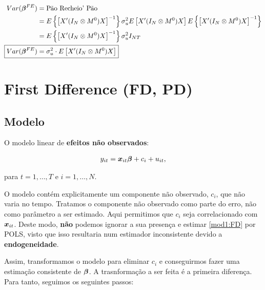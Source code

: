 \documentclass[11pt,oneside,a4paper]{article}
\numberwithin{equation}{section}
\begin{document}
\begin{description}
\noindent
{}

\vspace{-2 em}
\begin{align*}
Var( \mbs{\beta}^{FE} ) &= \text{Pão Recheio' Pão} 
\\ &=
E \left\{ \left[
X' ( I_{N} \otimes M^{0} ) X
\right]^{-1} \right\}
\sigma_{u}^{2} E\left[ X' ( I_{N} \otimes M^{0} ) X \right]
E \left\{ \left[
X' ( I_{N} \otimes M^{0} ) X
\right]^{-1} \right\}
\\  &=
E \left\{ \left[
X' ( I_{N} \otimes M^{0} ) X
\right]^{-1} \right\}
\sigma_{u}^{2} I_{NT}
\\
\Aboxed{ Var( \mbs{\beta}^{FE} ) &= \sigma_{u}^{2} \cdot  E\left[ X' ( I_{N} \otimes M^{0} ) X \right] }
\end{align*}


\clearpage
\section{First Difference (FD, PD)}


\subsection*{Modelo}

O modelo linear de \textbf{efeitos não observados}:

\vspace{-1 em}
\begin{align} \label{mod1:FD}
	y_{it} = \boldsymbol{x}_{it} \boldsymbol{\beta} + c_{i} + u_{it},
\end{align}

\noindent
para
$t = 1, \dots, T$ e $i = 1, \dots, N$.

O modelo contém explicitamente um componente não observado, $c_{i}$, que não varia no tempo.
Tratamos o componente não observado como parte do erro, não como parâmetro a ser estimado.
Aqui permitimos que $c_{i}$ seja correlacionado com $\boldsymbol{x}_{it}$.
Deste modo, \textbf{não} podemos ignorar a sua presença e estimar \eqref{mod1:FD} por POLS, visto que isso resultaria num estimador inconsistente devido a \textbf{endogeneidade}.

Assim, transformamos o modelo para eliminar $c_{i}$ e conseguirmos fazer uma estimação consistente de $\boldsymbol{\beta}$.
A trasnformação a ser feita é a primeira diferença.
Para tanto, seguimos os seguintes passos:


\end{description}
\end{document}
